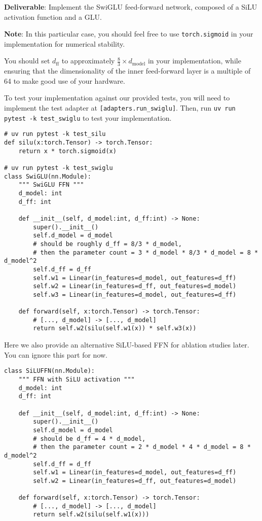 
\textbf{Deliverable}: Implement the SwiGLU feed-forward network, composed of a SiLU activation function and a GLU.

\textbf{Note}: In this particular case, you should feel free to use \lstinline{torch.sigmoid} in your implementation for numerical stability.

You should set $d_{\text{ff}}$ to approximately $\frac{8}{3} \times d_{\text{model}}$ in your implementation, while ensuring that the dimensionality of the inner feed-forward layer is a multiple of 64 to make good use of your hardware.

To test your implementation against our provided tests, you will need to implement the test adapter at \texttt{[adapters.run\_swiglu]}. Then, run \texttt{uv run pytest -k test\_swiglu} to test your implementation.

\begin{lstlisting}
# uv run pytest -k test_silu
def silu(x:torch.Tensor) -> torch.Tensor:
    return x * torch.sigmoid(x)

# uv run pytest -k test_swiglu
class SwiGLU(nn.Module):
    """ SwiGLU FFN """
    d_model: int
    d_ff: int
    
    def __init__(self, d_model:int, d_ff:int) -> None:
        super().__init__()
        self.d_model = d_model
        # should be roughly d_ff = 8/3 * d_model, 
        # then the parameter count = 3 * d_model * 8/3 * d_model = 8 * d_model^2
        self.d_ff = d_ff
        self.w1 = Linear(in_features=d_model, out_features=d_ff)
        self.w2 = Linear(in_features=d_ff, out_features=d_model)
        self.w3 = Linear(in_features=d_model, out_features=d_ff)
    
    def forward(self, x:torch.Tensor) -> torch.Tensor:
        # [..., d_model] -> [..., d_model]
        return self.w2(silu(self.w1(x)) * self.w3(x))
\end{lstlisting}

Here we also provide an alternative SiLU-based FFN for ablation studies later. You can ignore this part for now.

\begin{lstlisting}
class SiLUFFN(nn.Module):
    """ FFN with SiLU activation """
    d_model: int
    d_ff: int

    def __init__(self, d_model:int, d_ff:int) -> None:
        super().__init__()
        self.d_model = d_model
        # should be d_ff = 4 * d_model, 
        # then the parameter count = 2 * d_model * 4 * d_model = 8 * d_model^2
        self.d_ff = d_ff
        self.w1 = Linear(in_features=d_model, out_features=d_ff)
        self.w2 = Linear(in_features=d_ff, out_features=d_model)

    def forward(self, x:torch.Tensor) -> torch.Tensor:
        # [..., d_model] -> [..., d_model]
        return self.w2(silu(self.w1(x)))
\end{lstlisting}

